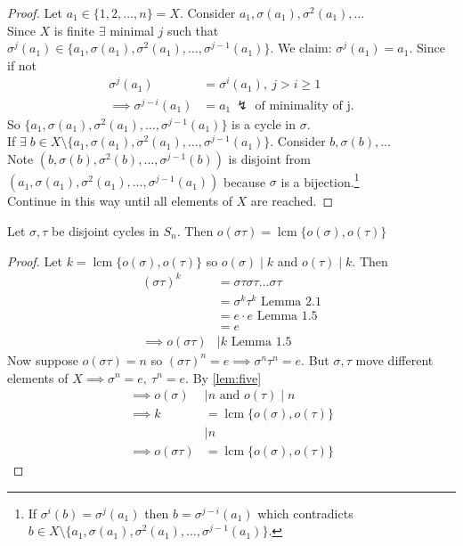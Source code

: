 \begin{proof}
Let \(a_1 \in \{ 1, 2, \ldots, n \} = X\).
Consider \(a_1, \sigma(a_1), \sigma^2(a_1), \ldots\)\\
Since \(X\) is finite \(\exists\) minimal \(j\) such that \(\sigma^j(a_1) \in \{ a_1, \sigma(a_1), \sigma^2(a_1), \ldots, \sigma^{j-1}(a_1) \}\).
We claim: \(\sigma^j(a_1) = a_1\).
Since if not \begin{align*}
    \sigma^j(a_1) &= \sigma^i(a_1),\ j > i \geq 1 \\
    \implies \sigma^{j - i}(a_1) &= a_1 \ ↯ \text{ of minimality of j.}
\end{align*}
So \(\{ a_1, \sigma(a_1), \sigma^2(a_1), \ldots, \sigma^{j-1}(a_1) \}\) is a cycle in \(\sigma\).\\
If \(\exists \; b \in X \setminus \{ a_1, \sigma(a_1), \sigma^2(a_1), \ldots, \sigma^{j-1}(a_1) \}\).
Consider \(b, \sigma(b), \ldots\)\\
Note \(\left(b, \sigma(b), \sigma^2(b), \ldots, \sigma^{j-1}(b) \right)\) is disjoint from \(\left( a_1, \sigma(a_1), \sigma^2(a_1), \ldots, \sigma^{j-1}(a_1) \right)\) because \(\sigma\) is a bijection.\footnote{If \(\sigma^i(b) = \sigma^j(a_1)\) then \(b = \sigma^{j - i}(a_1)\) which contradicts \(b \in X \setminus \{ a_1, \sigma(a_1), \sigma^2(a_1), \ldots, \sigma^{j-1}(a_1) \}\).}\\
Continue in this way until all elements of \(X\) are reached.
\end{proof}

\begin{lemma}
Let \(\sigma, \tau\) be disjoint cycles in \(S_n\).
Then \(o(\sigma \tau) = \operatorname{lcm} \{ o(\sigma), o(\tau) \}\)
\end{lemma}

\begin{proof}
Let \(k = \operatorname{lcm} \{ o(\sigma), o(\tau) \}\) so \(o(\sigma) \mid k\) and \(o(\tau) \mid k\).
Then \begin{align*}
    (\sigma \tau)^k &= \sigma \tau \sigma \tau \ldots \sigma \tau \\
    &= \sigma^k \tau^k \text{ Lemma 2.1} \\
    &= e \cdot e \text{ Lemma 1.5} \\
    &= e \\
    \implies o(\sigma \tau) &\mid k \text{ Lemma 1.5}
\end{align*}
Now suppose \(o(\sigma \tau) = n\) so \((\sigma \tau)^n = e \implies \sigma^n \tau^n = e\).
But \(\sigma, \tau\) move different elements of \(X \implies \sigma^n = e,\ \tau^n = e\).
By \ref{lem:five}
\begin{align*}
    \implies o(\sigma) &\mid n \text{ and } o(\tau) \mid n \\
    \implies k &= \operatorname{lcm} \{ o(\sigma), o(\tau) \} \\
    &\mid n \\
    \implies o(\sigma \tau) &= \operatorname{lcm} \{ o(\sigma), o(\tau) \}
\end{align*}
\end{proof}

